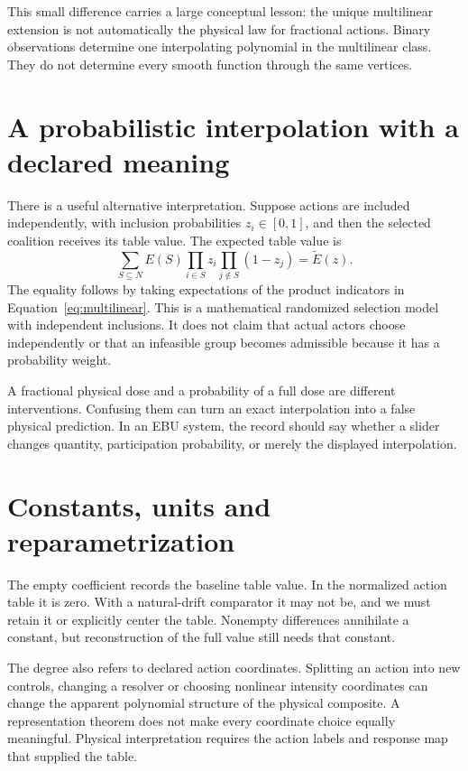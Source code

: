This small difference carries a large conceptual lesson: the unique multilinear extension is not automatically the physical law for fractional actions. Binary observations determine one interpolating polynomial in the multilinear class. They do not determine every smooth function through the same vertices.

\section{A probabilistic interpolation with a declared meaning}
There is a useful alternative interpretation. Suppose actions are included independently, with inclusion probabilities $z_i\in[0,1]$, and then the selected coalition receives its table value. The expected table value is
\begin{equation}
 \sum_{S\subseteq N}E(S)
 \prod_{i\in S}z_i\prod_{j\notin S}(1-z_j)
 =\widetilde E(z).
\end{equation}
The equality follows by taking expectations of the product indicators in Equation~\ref{eq:multilinear}. This is a mathematical randomized selection model with independent inclusions. It does not claim that actual actors choose independently or that an infeasible group becomes admissible because it has a probability weight.

A fractional physical dose and a probability of a full dose are different interventions. Confusing them can turn an exact interpolation into a false physical prediction. In an EBU system, the record should say whether a slider changes quantity, participation probability, or merely the displayed interpolation.

\section{Constants, units and reparametrization}
The empty coefficient records the baseline table value. In the normalized action table it is zero. With a natural-drift comparator it may not be, and we must retain it or explicitly center the table. Nonempty differences annihilate a constant, but reconstruction of the full value still needs that constant.

The degree also refers to declared action coordinates. Splitting an action into new controls, changing a resolver or choosing nonlinear intensity coordinates can change the apparent polynomial structure of the physical composite. A representation theorem does not make every coordinate choice equally meaningful. Physical interpretation requires the action labels and response map that supplied the table.

